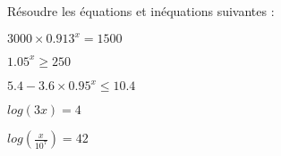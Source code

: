 Résoudre les équations et inéquations suivantes :

\begin{questions}
	
	\question[2] $\num{3000} \times \num{0.913}^x = \num{1500}$
	
	\fillwithdottedlines{3cm}
	
	\question[2] $\num{1.05}^x \geq 250$
	
	\fillwithdottedlines{3cm}
	
	\question[2] $\num{5.4} - \num{3.6} \times \num{0.95}^x \leq \num{10.4}$
	
	\fillwithdottedlines{3cm}
	
	\question[2] $log(3x) = \num{4}$
	
	\fillwithdottedlines{3.5cm}
	
	\question[2] $log\left(\frac{x}{10^7}\right) = \num{42}$
	
	\fillwithdottedlines{3.5cm}
\end{questions}